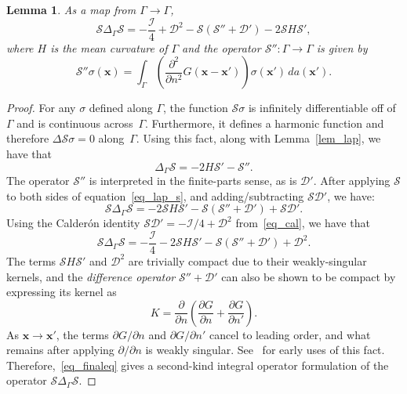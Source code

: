 \documentclass[11pt]{article}
\newcommand{\surflap}{\Delta_\Gamma}
\newcommand{\bx}{\bm x}
\newcommand{\cI}{\mathcal I}
\newcommand{\cS}{\mathcal S}
\newcommand{\cD}{\mathcal D}
\newtheorem{lemma}[theorem]{Lemma}
\numberwithin{equation}{section}
\begin{document}
\begin{lemma}\label{lem_slaps}
As a map from $\Gamma \to \Gamma$, 
\begin{equation}\label{eq_laps1}
\cS \surflap \cS = -\frac{\cI}{4} +  \cD^2  - 
\cS(\cS'' + \cD') - 2\cS H \cS'  ,
\end{equation}
where $H$ is the mean curvature of $\Gamma$ and the operator
$\cS'':\Gamma \to \Gamma$ is given by
\begin{equation}
  \cS''\sigma(\bx) = \int_\Gamma \left( \frac{\partial^2 }
  {\partial n^2 } G(\bx-\bx') \right)  \sigma(\bx') \, da(\bx').
\end{equation}
\end{lemma}
\begin{proof}
  For any $\sigma$ defined along $\Gamma$,
  the function $\cS \sigma$ is infinitely differentiable off of
$\Gamma$ and is 
continuous across~$\Gamma$.
Furthermore, it defines a
harmonic function and therefore $\Delta \cS \sigma = 0$ along~$\Gamma$.
Using this fact, along with 
Lemma~\ref{lem_lap}, we have that
\begin{equation}\label{eq_lap_s}
\surflap \cS =  - 2H\cS' -   \cS'' .
\end{equation}
The operator $\cS''$ is interpreted in the finite-parts sense, 
as is $\cD'$.
After applying $\cS$ to both sides of equation~\eqref{eq_lap_s},
and adding/subtracting $\cS\cD'$, we have:
\begin{equation}
  \cS \surflap \cS  = -2\cS H \cS' - \cS \left( \cS''
    + \cD'\right) + \cS\cD'.
\end{equation}
Using the Calder\'on identity $\cS\cD' = -\cI/4 + \cD^2$
from~\eqref{eq_cal}, 
we have that
\begin{equation}\label{eq_finaleq}
  \cS \surflap \cS  = -\frac{\cI}{4} -2\cS H \cS' - \cS \left( \cS''
    + \cD'\right) + \cD^2.
\end{equation}
The terms $\cS H \cS'$ and $\cD^2$ are trivially compact due to their
weakly-singular kernels, and the
\emph{difference operator} $\cS'' + \cD'$ can also be shown to be
compact by expressing its kernel as
\begin{equation}
  K = \frac{\partial}{\partial n} \left( \frac{\partial G}{\partial n}
   + \frac{\partial G}{\partial n'} \right).
\end{equation}
As $\bx \to \bx'$, the terms $\partial G/\partial n$ and $\partial
G/\partial n'$ cancel to leading order, and what remains after
applying $\partial/\partial n$ is weakly
singular. See~\cite{rokhlin_1983,kress_1978}
for early uses of this fact.
Therefore,~\eqref{eq_finaleq} gives a second-kind integral operator
formulation of the operator $\cS \surflap \cS$.
\end{proof}
\end{document}
